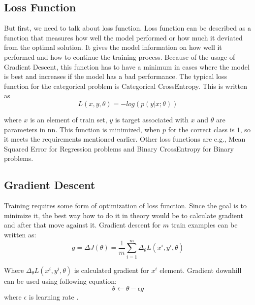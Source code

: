 \documentclass[thesis=B,english]{FITthesis}[2019/12/23]
\begin{document}
\subsection{Loss Function}
    But first, we need to talk about loss function. Loss function can be described as a function that measures how well the model performed or how much it deviated from the optimal solution. It gives the model information on how well it performed and how to continue the training process. Because of the usage of Gradient Descent, this function has to have a minimum in cases where the model is best and increases if the model has a bad performance. The typical loss function for the categorical problem is Categorical CrossEntropy. This is written as
    $$L(x, y, \theta) = - log(p(y|x;\theta))$$
    
    where $x$ is an element of train set, $y$ is target associated with $x$ and $\theta$ are parameters in \gls{nn}. This function is minimized, when $p$ for the correct class is $1$, so it meets the requirements mentioned earlier. Other loss functions are e.g., Mean Squared Error for Regression problems and Binary CrossEntropy for Binary problems.
    

\subsection{Gradient Descent}
    Training requires some form of optimization of loss function. Since the goal is to minimize it, the best way how to do it in theory would be to calculate gradient and after that move against it. Gradient descent for $m$ train examples can be written as:
    $$g = \Delta J(\theta) = \frac{1}{m}\sum_{i=1}^m\Delta_{\theta}L(x^{i}, y^{i}, \theta)$$
    
    Where $\Delta_{\theta}L(x^{i}, y^{i}, \theta)$ is calculated gradient for $x^i$ element. Gradient downhill can be used using following equation:
    $$\theta \leftarrow \theta - \epsilon g$$
    where $\epsilon$ is learning rate \cite{bengio2017deep}.
    
\end{document}
